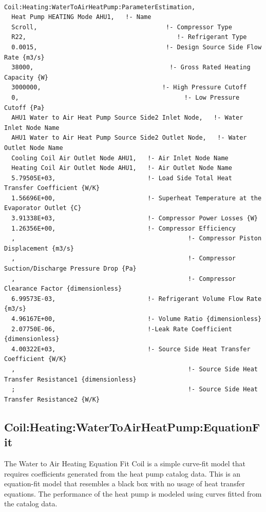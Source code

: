 \begin{lstlisting}

Coil:Heating:WaterToAirHeatPump:ParameterEstimation,
  Heat Pump HEATING Mode AHU1,   !- Name
  Scroll,                                   !- Compressor Type
  R22,                                         !- Refrigerant Type
  0.0015,                                   !- Design Source Side Flow Rate {m3/s}
  38000,                                     !- Gross Rated Heating Capacity {W}
  3000000,                                 !- High Pressure Cutoff
  0,                                             !- Low Pressure Cutoff {Pa}
  AHU1 Water to Air Heat Pump Source Side2 Inlet Node,   !- Water Inlet Node Name
  AHU1 Water to Air Heat Pump Source Side2 Outlet Node,   !- Water Outlet Node Name
  Cooling Coil Air Outlet Node AHU1,   !- Air Inlet Node Name
  Heating Coil Air Outlet Node AHU1,   !- Air Outlet Node Name
  5.79505E+03,                         !- Load Side Total Heat Transfer Coefficient {W/K}
  1.56696E+00,                         !- Superheat Temperature at the Evaporator Outlet {C}
  3.91338E+03,                         !- Compressor Power Losses {W}
  1.26356E+00,                         !- Compressor Efficiency
  ,                                               !- Compressor Piston Displacement {m3/s}
  ,                                               !- Compressor Suction/Discharge Pressure Drop {Pa}
  ,                                               !- Compressor Clearance Factor {dimensionless}
  6.99573E-03,                         !- Refrigerant Volume Flow Rate {m3/s}
  4.96167E+00,                         !- Volume Ratio {dimensionless}
  2.07750E-06,                         !-Leak Rate Coefficient {dimensionless}
  4.00322E+03,                         !- Source Side Heat Transfer Coefficient {W/K}
  ,                                               !- Source Side Heat Transfer Resistance1 {dimensionless}
  ;                                               !- Source Side Heat Transfer Resistance2 {W/K}
\end{lstlisting}

\subsection{Coil:Heating:WaterToAirHeatPump:EquationFit}\label{coilheatingwatertoairheatpumpequationfit}

The Water to Air Heating Equation Fit Coil is a simple curve-fit model that requires coefficients generated from the heat pump catalog data. This is an equation-fit model that resembles a black box with no usage of heat transfer equations. The performance of the heat pump is modeled using curves fitted from the catalog data.

